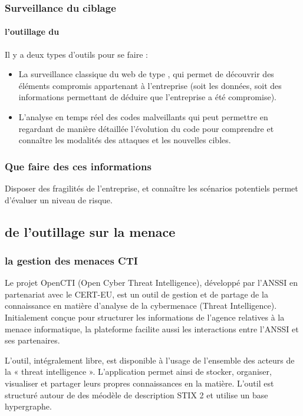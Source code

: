 \begin{frame}
\frametitle<presentation>{Surveillance du ciblage}
\framesubtitle<presentation>{l'outillage du }
Il y a deux types d'outils pour se faire : 

\begin{itemize}
	\item La surveillance classique du web de type , qui permet de découvrir des éléments compromis appartenant à l'entreprise (soit les données, soit des informations permettant de déduire que l'entreprise a été compromise).
	\item L'analyse en temps réel des codes malveillants qui peut permettre en regardant de manière détaillée l'évolution du code pour comprendre et connaître les modalités des attaques et les nouvelles cibles.
\end{itemize}
\end{frame}


\subsubsection{Que faire des ces informations}

Disposer des fragilités de l'entreprise, et connaître les scénarios potentiels permet d'évaluer un niveau de risque. 

\subsection{de l'outillage sur la menace}

\subsubsection{la gestion des menaces CTI}

Le projet OpenCTI (Open Cyber Threat Intelligence), développé par l’ANSSI en partenariat avec le CERT-EU, est un outil de gestion et de partage de la connaissance en matière d’analyse de la cybermenace (Threat Intelligence). Initialement conçue pour structurer les informations de l’agence relatives à la menace informatique, la plateforme facilite aussi les interactions entre l’ANSSI et ses partenaires.

L’outil, intégralement libre, est  disponible à l’usage de l’ensemble des acteurs de la « threat intelligence ». L’application permet ainsi de stocker, organiser, visualiser et partager leurs propres connaissances en la matière. L'outil est structuré autour de des méodèle de description STIX 2 et utilise un base hypergraphe.

